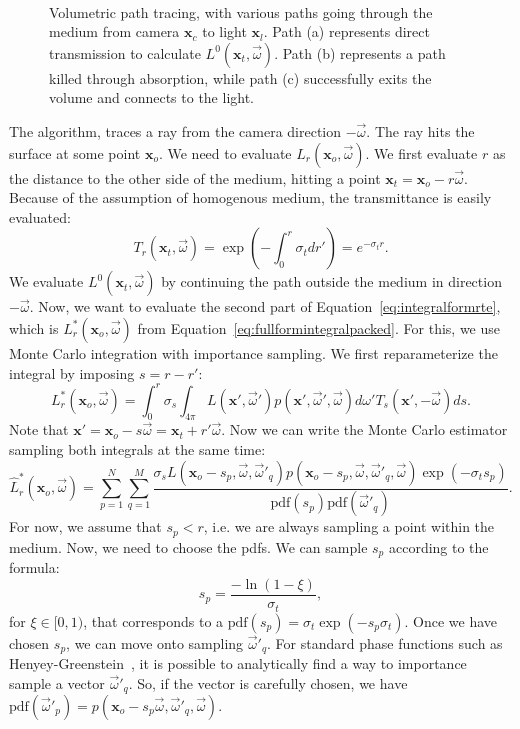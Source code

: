 \begin{figure}
\centering
   \def\svgwidth{0.7\textwidth}
    \\
\caption{Volumetric path tracing, with various paths going through the medium from camera $\mathbf{x}_c$ to light $\mathbf{x}_l$. Path (a) represents direct transmission to calculate $L^0(\mathbf{x}_t, \vec{\omega})$. Path (b) represents a path killed through absorption, while path (c) successfully exits the volume and connects to the light.} 
\label{fig:vpt}
\end{figure}

The algorithm, traces a ray from the camera direction $-\vec{\omega}$. The ray hits the surface at some point $\mathbf{x}_o$. We need to evaluate $L_r(\mathbf{x}_o, \vec{\omega})$. We first evaluate $r$ as the distance to the other side of the medium, hitting a point $\mathbf{x}_t = \mathbf{x}_o - r \vec{\omega}$. Because of the assumption of homogenous medium, the transmittance is easily evaluated:
\begin{equation*}
T_r(\mathbf{x}_t, \vec{\omega}) = \exp\left(-\int_0^r \sigma_t dr'\right) = e^{-\sigma_t r}.
\end{equation*}
We evaluate $L^0(\mathbf{x}_t, \vec{\omega})$ by continuing the path outside the medium in direction $-\vec{\omega}$. Now, we want to evaluate the second part of Equation~\ref{eq:integralformrte}, which is $L_r^*(\mathbf{x}_o, \vec{\omega})$ from Equation~\ref{eq:fullformintegralpacked}. For this, we use Monte Carlo integration with importance sampling. We first reparameterize the integral by imposing $s = r - r'$:
\begin{equation*}
L_r^*(\mathbf{x}_o, \vec{\omega}) = \int_0^r \sigma_s \int_{4\pi} L(\mathbf{x}', \vec{\omega}') p(\mathbf{x}', \vec{\omega}', \vec{\omega})  d\omega' T_{s}(\mathbf{x}', -\vec{\omega})  ds.
\end{equation*}
Note that $\mathbf{x}' = \mathbf{x}_o - s \vec{\omega} = \mathbf{x}_t + r' \vec{\omega}$. Now we can write the Monte Carlo estimator sampling both integrals at the same time:
\begin{equation}
\label{eq:lrintermediate}
\hat{L}_r^*(\mathbf{x}_o, \vec{\omega}) = \sum_{p=1}^N\sum_{q=1}^M \frac{\sigma_s L(\mathbf{x}_o - s_p, \vec{\omega}, \vec{\omega}'_q) p(\mathbf{x}_o - s_p, \vec{\omega}, \vec{\omega}'_q, \vec{\omega}) \exp(-\sigma_t s_p)}{\text{pdf}(s_p) \text{pdf}(\vec{\omega}'_q)}.
\end{equation}
For now, we assume that $s_p < r$, i.e. we are always sampling a point within the medium. Now, we need to choose the pdfs.  We can sample $s_p$ according to the formula:
\begin{equation*}
s_p = \frac{-\ln(1 - \xi)}{\sigma_t},
\end{equation*}
for $\xi \in [0,1)$, that corresponds to a $\text{pdf}(s_p) = \sigma_t \exp(-s_p \sigma_t)$. Once we have chosen $s_p$, we can move onto sampling $\vec{\omega}'_q$. For standard phase functions such as Henyey-Greenstein~\cite{Henyey1940}, it is possible to analytically find a way to importance sample a vector $\vec{\omega}'_q$. So, if the vector is carefully chosen, we have $\text{pdf}(\vec{\omega}'_p) = p(\mathbf{x}_o - s_p \vec{\omega}, \vec{\omega}'_q, \vec{\omega})$.

